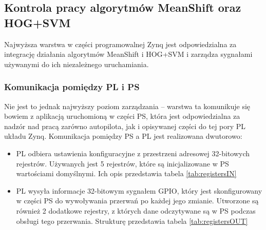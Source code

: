 \subsection{Kontrola pracy algorytmów MeanShift oraz HOG+SVM} %
Najwyższa warstwa w części programowalnej Zynq jest odpowiedzialna za integrację działania algorytmów MeanShift i HOG+SVM i zarządza sygnałami używanymi do ich niezależnego uruchamiania. %
\subsubsection{Komunikacja pomiędzy PL i PS}
Nie jest to jednak najwyższy poziom zarządzania -- warstwa ta komunikuje się bowiem z aplikacją uruchomioną w części PS, która jest odpowiedzialna za nadzór nad pracą zarówno autopilota, jak i opisywanej części do tej pory PL układu Zynq.
Komunikacja pomiędzy PS a PL jest realizowana dwutorowo:
\begin{itemize}
	\item PL odbiera ustawienia konfiguracyjne z przestrzeni adresowej 32-bitowych rejestrów. Używanych jest 5 rejestrów, które są inicjalizowane w PS wartościami domyślnymi. Ich opis przedstawia tabela \ref{tab:registersIN}	
	\item PL wysyła informacje 32-bitowym sygnałem GPIO, który jest skonfigurowany w części PS do wywoływania przerwań po każdej jego zmianie. Utworzone są również 2 dodatkowe rejestry, z których dane odczytywane są w PS podczas obsługi tego przerwania. Strukturę przedstawia tabela \ref {tab:registersOUT}
\end{itemize} 

